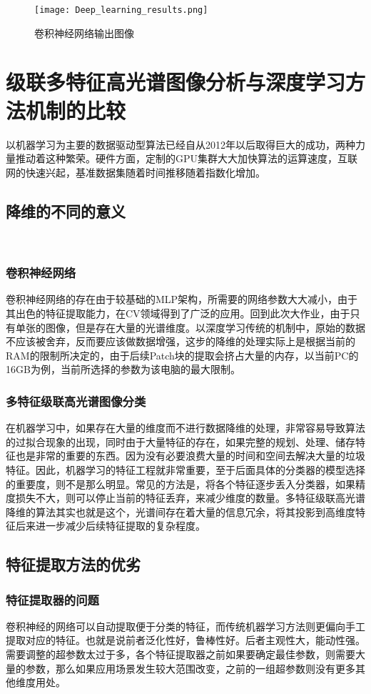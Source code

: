 \documentclass[runningheads]{llncs}
\begin{document}
\begin{figure}[htbp]
    \centering
    \texttt{[image: Deep\_learning\_results.png]}
    \caption{卷积神经网络输出图像}
    \label{fig:train}
\end{figure}


\section{级联多特征高光谱图像分析与深度学习方法机制的比较}
以机器学习为主要的数据驱动型算法已经自从2012年以后取得巨大的成功，两种力量推动着这种繁荣。硬件方面，定制的GPU集群大大加快算法的运算速度，互联网的快速兴起，基准数据集随着时间推移随着指数化增加。
\subsection{降维的不同的意义}
\\
\subsubsection{卷积神经网络}
卷积神经网络的存在由于较基础的MLP架构，所需要的网络参数大大减小，由于其出色的特征提取能力，在CV领域得到了广泛的应用。回到此次大作业，由于只有单张的图像，但是存在大量的光谱维度。以深度学习传统的机制中，原始的数据不应该被舍弃，反而要应该做数据增强，这步的降维的处理实际上是根据当前的RAM的限制所决定的，由于后续Patch块的提取会挤占大量的内存，以当前PC的16GB为例，当前所选择的参数为该电脑的最大限制。


\subsubsection{多特征级联高光谱图像分类}
在机器学习中，如果存在大量的维度而不进行数据降维的处理，非常容易导致算法的过拟合现象的出现，同时由于大量特征的存在，如果完整的规划、处理、储存特征也是非常的重要的东西。因为没有必要浪费大量的时间和空间去解决大量的垃圾特征。因此，机器学习的特征工程就非常重要，至于后面具体的分类器的模型选择的重要度，则不是那么明显。常见的方法是，将各个特征逐步丢入分类器，如果精度损失不大，则可以停止当前的特征丢弃，来减少维度的数量。多特征级联高光谱降维的算法其实也就是这个，光谱间存在着大量的信息冗余，将其投影到高维度特征后来进一步减少后续特征提取的复杂程度。


\subsection{特征提取方法的优劣}
\subsubsection{特征提取器的问题}
卷积神经的网络可以自动提取便于分类的特征，而传统机器学习方法则更偏向手工提取对应的特征。也就是说前者泛化性好，鲁棒性好。后者主观性大，能动性强。需要调整的超参数太过于多，各个特征提取器之前如果要确定最佳参数，则需要大量的参数，那么如果应用场景发生较大范围改变，之前的一组超参数则没有更多其他维度用处。
\end{document}
